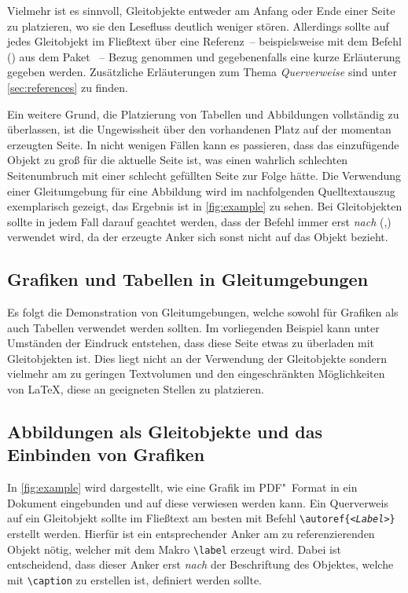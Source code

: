 \documentclass[%
  english,ngerman,%
  cdgeometry=no,DIV=12,automark%
]{tudscrartcl}
\begin{document}
Vielmehr ist es sinnvoll, Gleitobjekte entweder am Anfang oder Ende einer Seite 
zu platzieren, wo sie den Lesefluss deutlich weniger stören. Allerdings sollte 
auf jedes Gleitobjekt im Fließtext über eine Referenz~-- beispielsweise mit dem 
Befehl () aus dem Paket ~-- 
Bezug genommen und gegebenenfalls eine kurze Erläuterung gegeben werden. 
Zusätzliche Erläuterungen zum Thema \emph{Querverweise} sind unter 
\autoref{sec:references} zu finden.

Ein weitere Grund,  die Platzierung von Tabellen und Abbildungen 
vollständig zu überlassen, ist die Ungewissheit über den vorhandenen Platz auf 
der momentan erzeugten Seite. In nicht wenigen Fällen kann es passieren, dass 
das einzufügende Objekt zu groß für die aktuelle Seite ist, was einen wahrlich 
schlechten Seitenumbruch mit einer schlecht gefüllten Seite zur Folge hätte.
Die Verwendung einer Gleitumgebung für eine Abbildung wird im nachfolgenden 
Quelltextauszug exemplarisch gezeigt, das Ergebnis ist in \autoref{fig:example} 
zu sehen. Bei Gleitobjekten sollte in jedem Fall darauf geachtet werden, dass 
der Befehl  immer erst \emph{nach} 
(,) verwendet wird, da 
der erzeugte Anker sich sonst nicht auf das Objekt bezieht.
%
\begin{Trunk+}
\section{Grafiken und Tabellen in Gleitumgebungen}
Es folgt die Demonstration von Gleitumgebungen, welche sowohl für 
Grafiken als auch Tabellen verwendet werden sollten. Im vorliegenden 
Beispiel kann unter Umständen der Eindruck entstehen, dass diese Seite 
etwas zu überladen mit Gleitobjekten ist. Dies liegt nicht an der 
Verwendung der Gleitobjekte sondern vielmehr am zu geringen Textvolumen 
und den eingeschränkten Möglichkeiten von \LaTeX{}, diese an geeigneten 
Stellen zu platzieren. 

\subsection{Abbildungen als Gleitobjekte und das Einbinden von Grafiken}
In \autoref{fig:example} wird dargestellt, wie eine Grafik im PDF"~Format 
in ein Dokument eingebunden und auf diese verwiesen werden kann. Ein 
Querverweis auf ein Gleitobjekt sollte im Fließtext am besten mit Befehl 
\texttt{\textbackslash autoref\{\emph{<Label>}\}} erstellt werden. 
Hierfür ist ein entsprechender Anker am zu referenzierenden Objekt nötig, 
welcher mit dem Makro \texttt{\textbackslash label} erzeugt wird. Dabei 
ist entscheidend, dass dieser Anker erst \emph{nach} der Beschriftung des 
Objektes, welche mit \texttt{\textbackslash caption} zu erstellen ist, 
definiert werden sollte.

\end{Trunk+}
\end{document}

